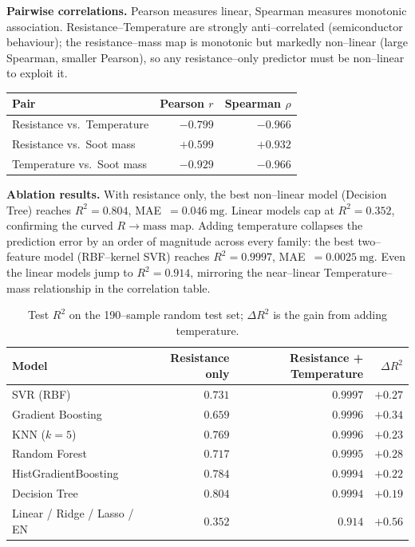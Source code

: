 \documentclass[10pt]{article}
\begin{document}
\textbf{Pairwise correlations.}
Pearson measures linear, Spearman measures monotonic association.
Resistance--Temperature are strongly anti--correlated (semiconductor behaviour);
the resistance--mass map is monotonic but markedly non--linear (large Spearman,
smaller Pearson), so any resistance--only predictor must be non--linear to
exploit it.

\begin{center}\small
\begin{tabular}{lrr}
\toprule
Pair & Pearson $r$ & Spearman $\rho$ \\
\midrule
Resistance vs.\ Temperature   & $-0.799$ & $-0.966$ \\
Resistance vs.\ Soot mass     & $+0.599$ & $+0.932$ \\
Temperature vs.\ Soot mass    & $-0.929$ & $-0.966$ \\
\bottomrule
\end{tabular}
\end{center}

\textbf{Ablation results.}
With resistance only, the best non--linear model (Decision Tree) reaches
$R^{2}=0.804$, MAE~$=\SI{0.046}{\milli\gram}$. Linear models cap at
$R^{2}=0.352$, confirming the curved $R\!\to\!\text{mass}$ map. Adding
temperature collapses the prediction error by an order of magnitude across
every family: the best two--feature model (RBF--kernel SVR) reaches
$R^{2}=0.9997$, MAE~$=\SI{0.0025}{\milli\gram}$. Even the linear models jump
to $R^{2}=0.914$, mirroring the near--linear Temperature--mass relationship in
the correlation table.

\begin{table}[h]\centering\small
\caption{Test $R^{2}$ on the 190--sample random test set; $\Delta R^{2}$ is
the gain from adding temperature.}
\label{tab:r2}
\begin{tabular}{lrrr}
\toprule
Model & Resistance only & Resistance + Temperature & $\Delta R^{2}$ \\
\midrule
SVR (RBF)                    & $0.731$ & $0.9997$ & $+0.27$ \\
Gradient Boosting            & $0.659$ & $0.9996$ & $+0.34$ \\
KNN ($k=5$)                  & $0.769$ & $0.9996$ & $+0.23$ \\
Random Forest                & $0.717$ & $0.9995$ & $+0.28$ \\
HistGradientBoosting         & $0.784$ & $0.9994$ & $+0.22$ \\
Decision Tree                & $0.804$ & $0.9994$ & $+0.19$ \\
Linear / Ridge / Lasso / EN  & $0.352$ & $0.914$  & $+0.56$ \\
\bottomrule
\end{tabular}
\end{table}
\end{document}
